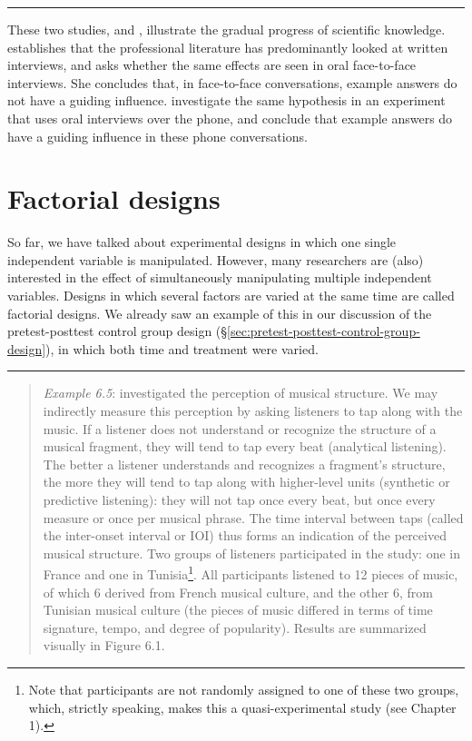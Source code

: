 \documentclass[
]{book}
\begin{document}
\begin{center}\rule{0.5\linewidth}{0.5pt}\end{center}

These two studies, \citet{Houtk91} and \citet{Wijff92}, illustrate the gradual progress of scientific knowledge. \citet{Houtk91} establishes that the professional literature has predominantly looked at written interviews, and asks whether the same effects are seen in oral face-to-face interviews. She concludes that, in face-to-face conversations, example answers do not have a guiding influence. \citet{Wijff92} investigate the same hypothesis in an experiment that uses oral interviews over the phone, and conclude that example answers do have a guiding influence in these phone conversations.

\section{Factorial designs}\label{sec:factorial-designs}

So far, we have talked about experimental designs in which one single independent variable is manipulated. However, many researchers are (also) interested in the effect of simultaneously manipulating multiple independent variables. Designs in which several factors are varied at the same time are called factorial designs. We already saw an example of this in our discussion of the pretest-posttest control group design (§\ref{sec:pretest-posttest-control-group-design}), in which both time and treatment were varied.

\begin{center}\rule{0.5\linewidth}{0.5pt}\end{center}

\begin{quote}
\emph{Example 6.5}: \citet{Drake03} investigated the perception of musical structure. We may indirectly measure this perception by asking listeners to tap along with the music. If a listener does not understand or recognize the structure of a musical fragment, they will tend to tap every beat (analytical listening). The better a listener understands and recognizes a fragment's structure, the more they will tend to tap along with higher-level units (synthetic or predictive listening): they will not tap once every beat, but once every measure or once per musical phrase. The time interval between taps (called the inter-onset interval or IOI) thus forms an indication of the perceived musical structure. Two groups of listeners participated in the study: one in France and one in Tunisia\footnote{Note that participants are not randomly assigned to one of these two groups, which, strictly speaking, makes this a quasi-experimental study (see Chapter 1).}. All participants listened to 12 pieces of music, of which 6 derived from French musical culture, and the other 6, from Tunisian musical culture (the pieces of music differed in terms of time signature, tempo, and degree of popularity). Results are summarized visually in Figure 6.1.
\end{quote}
\end{document}
